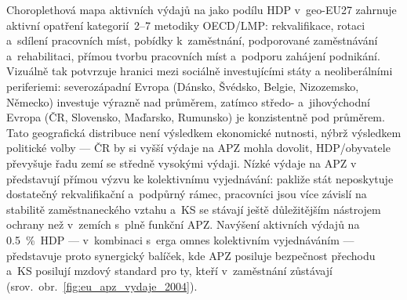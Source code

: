 Choroplethová mapa aktivních výdajů na  jako podílu \ac{HDP} v~\acs{geo-EU27} zahrnuje aktivní opatření kategorií~2--7 metodiky \acs{OECD}/LMP: rekvalifikace, rotaci a~sdílení pracovních míst, pobídky k~zaměstnání, podporované zaměstnávání a~rehabilitaci, přímou tvorbu pracovních míst a~podporu zahájení podnikání.
Vizuálně tak potvrzuje hranici mezi sociálně investujícími státy a neoliberálními periferiemi: severozápadní Evropa (Dánsko, Švédsko, Belgie, Nizozemsko, Německo) investuje výrazně nad průměrem, zatímco středo- a~jihovýchodní Evropa (\ac{ČR}, Slovensko, Maďarsko, Rumunsko) je konzistentně pod průměrem.
Tato geografická distribuce není výsledkem ekonomické nutnosti, nýbrž výsledkem politické volby --- \ac{ČR} by si vyšší výdaje na \ac{APZ} mohla dovolit, \ac{HDP}/obyvatele převyšuje řadu zemí se středně vysokými výdaji.
Nízké výdaje na \ac{APZ} v~ představují přímou výzvu ke kolektivnímu vyjednávání: pakliže stát neposkytuje dostatečný rekvalifikační a~podpůrný rámec, pracovníci jsou více závislí na stabilitě zaměstnaneckého vztahu a~\acs{KS} se stávají ještě důležitějším nástrojem ochrany než v~zemích s~plně funkční \ac{APZ}.
Navýšení aktivních výdajů na \SI{0,5}{\percent}~\ac{HDP} --- v~kombinaci s~erga omnes kolektivním vyjednáváním --- představuje proto synergický balíček, kde \ac{APZ} posiluje bezpečnost přechodu a~\ac{KS} posilují mzdový standard pro ty, kteří v~zaměstnání zůstávají (srov.~obr.~\ref{fig:eu_apz_vydaje_2004}).


